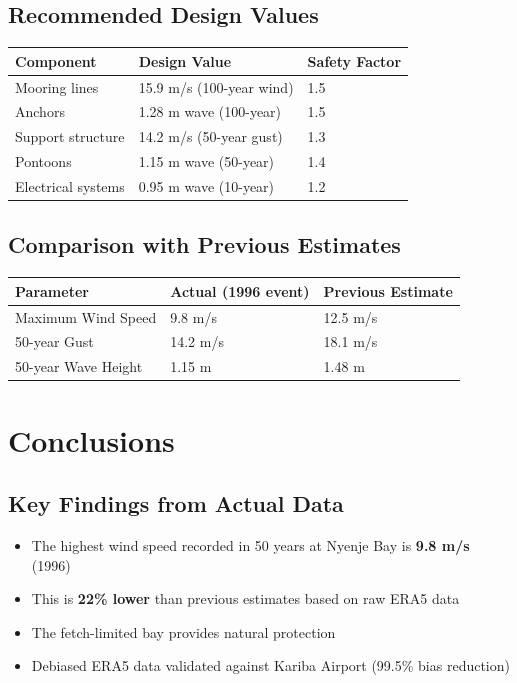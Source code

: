 \documentclass[12pt]{article}
\begin{document}
\subsection{Recommended Design Values}

\begin{center}
\begin{tabular}{|l|l|l|}
\hline
\textbf{Component} & \textbf{Design Value} & \textbf{Safety Factor} \\
\hline
Mooring lines & 15.9 m/s (100-year wind) & 1.5 \\
Anchors & 1.28 m wave (100-year) & 1.5 \\
Support structure & 14.2 m/s (50-year gust) & 1.3 \\
Pontoons & 1.15 m wave (50-year) & 1.4 \\
Electrical systems & 0.95 m wave (10-year) & 1.2 \\
\hline
\end{tabular}
\end{center}

\subsection{Comparison with Previous Estimates}

\begin{center}
\begin{tabular}{|l|l|l|}
\hline
\textbf{Parameter} & \textbf{Actual (1996 event)} & \textbf{Previous Estimate} \\
\hline
Maximum Wind Speed & 9.8 m/s & 12.5 m/s \\
50-year Gust & 14.2 m/s & 18.1 m/s \\
50-year Wave Height & 1.15 m & 1.48 m \\
\hline
\end{tabular}
\end{center}

\newpage

\section{Conclusions}

\subsection{Key Findings from Actual Data}

\begin{itemize}
    \item The highest wind speed recorded in 50 years at Nyenje Bay is \textbf{9.8 m/s} (1996)
    \item This is \textbf{22\% lower} than previous estimates based on raw ERA5 data
    \item The fetch-limited bay provides natural protection
    \item Debiased ERA5 data validated against Kariba Airport (99.5\% bias reduction)
\end{itemize}
\end{document}
